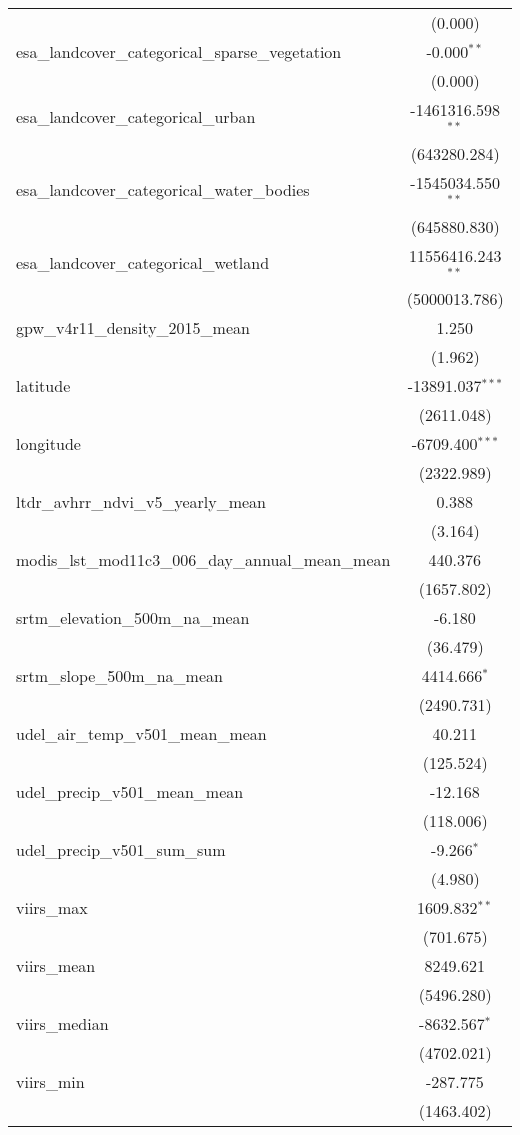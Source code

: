 \begin{table}[!htbp]
\begin{tabular}{@{\extracolsep{5pt}}lc}
  & (0.000) \\
 esa_landcover_categorical_sparse_vegetation & -0.000$^{**}$ \\
  & (0.000) \\
 esa_landcover_categorical_urban & -1461316.598$^{**}$ \\
  & (643280.284) \\
 esa_landcover_categorical_water_bodies & -1545034.550$^{**}$ \\
  & (645880.830) \\
 esa_landcover_categorical_wetland & 11556416.243$^{**}$ \\
  & (5000013.786) \\
 gpw_v4r11_density_2015_mean & 1.250$^{}$ \\
  & (1.962) \\
 latitude & -13891.037$^{***}$ \\
  & (2611.048) \\
 longitude & -6709.400$^{***}$ \\
  & (2322.989) \\
 ltdr_avhrr_ndvi_v5_yearly_mean & 0.388$^{}$ \\
  & (3.164) \\
 modis_lst_mod11c3_006_day_annual_mean_mean & 440.376$^{}$ \\
  & (1657.802) \\
 srtm_elevation_500m_na_mean & -6.180$^{}$ \\
  & (36.479) \\
 srtm_slope_500m_na_mean & 4414.666$^{*}$ \\
  & (2490.731) \\
 udel_air_temp_v501_mean_mean & 40.211$^{}$ \\
  & (125.524) \\
 udel_precip_v501_mean_mean & -12.168$^{}$ \\
  & (118.006) \\
 udel_precip_v501_sum_sum & -9.266$^{*}$ \\
  & (4.980) \\
 viirs_max & 1609.832$^{**}$ \\
  & (701.675) \\
 viirs_mean & 8249.621$^{}$ \\
  & (5496.280) \\
 viirs_median & -8632.567$^{*}$ \\
  & (4702.021) \\
 viirs_min & -287.775$^{}$ \\
  & (1463.402) \\

\end{tabular}
\end{table}
